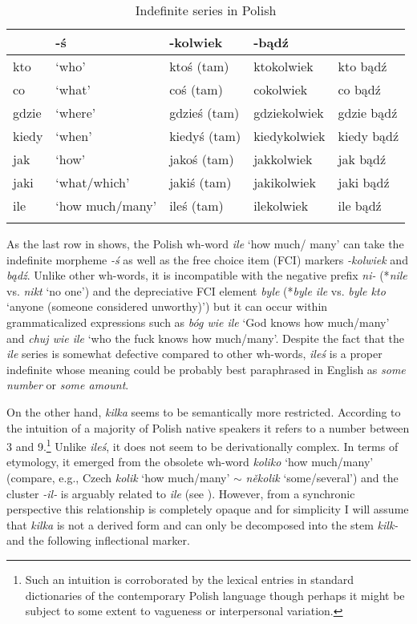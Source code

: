 \documentclass[output=paper,
]{langscibook}
\begin{document}
	\begin{table}[h]
		\centering
		\caption{Indefinite series in Polish}
		\label{table:indefinite-series-in-polish}
		\begin{tabularx}{\textwidth}{llXXX}
			\lsptoprule
			\multicolumn{2}{l}{wh-word} & -ś     & -kolwiek     & -bądź      \\ \midrule
			kto     & `who'   & ktoś (tam)   & ktokolwiek   & kto bądź   \\
			co      & `what'   & coś (tam)   & cokolwiek    & co bądź    \\
			gdzie   & `where'  & gdzieś (tam) & gdziekolwiek & gdzie bądź \\
			kiedy   & `when'   & kiedyś (tam) & kiedykolwiek & kiedy bądź \\
			jak     & `how'    & jakoś (tam) & jakkolwiek   & jak bądź   \\
			jaki    & `what/which'   & jakiś (tam) & jakikolwiek  & jaki bądź  \\
			ile     & `how much/many'  & ileś (tam)  & ilekolwiek   & ile bądź   \\ \lspbottomrule
		\end{tabularx}
	\end{table}
	
	As the last row in  shows, the Polish wh-word \textit{ile} `how much/ many' can take the indefinite morpheme \textit{-ś} as well as the free choice item (FCI) markers \textit{-kolwiek} and \textit{bądź}. Unlike other wh-words, it is incompatible with the negative prefix \textit{ni-} (*\textit{nile} vs. \textit{nikt} `no one') and the depreciative FCI element \textit{byle} (*\textit{byle ile} vs. \textit{byle kto} `anyone (someone considered unworthy)') but it can occur within grammaticalized expressions such as \textit{bóg wie ile} `God knows how much/many' and \textit{chuj wie ile} `who the fuck knows how much/many'. Despite the fact that the \textit{ile} series is somewhat defective compared to other wh-words, \textit{ileś} is a proper indefinite whose meaning could be probably best paraphrased in English as \textit{some number} or \textit{some amount}.
	
	On the other hand, \textit{kilka} seems to be semantically more restricted. According to the intuition of a majority of Polish native speakers it refers to a number between 3 and 9.\footnote{Such an intuition is corroborated by the lexical entries in standard dictionaries of the contemporary Polish language though perhaps it might be subject to some extent to vagueness or interpersonal variation.} Unlike \textit{ileś}, it does not seem to be derivationally complex. In terms of etymology, it emerged from the obsolete wh-word \textit{koliko} `how much/many' (compare, e.g., Czech \textit{kolik} `how much/many' $\sim$ \textit{několik} `some/several') and the cluster \textit{-il-} is arguably related to \textit{ile} (see \citealt{bankowski2000etymologiczny}). However, from a synchronic perspective this relationship is completely opaque and for simplicity I will assume that \textit{kilka} is not a derived form and can only be decomposed into the stem \textit{kilk-} and the following inflectional marker.
	
\end{document}
